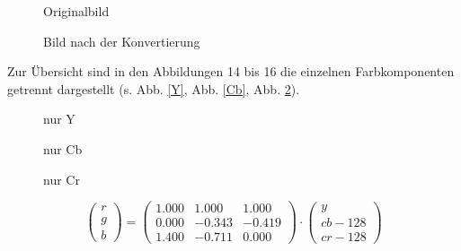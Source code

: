 \documentclass[a4paper,12pt,abstracton,titlepage]{scrartcl}
\begin{document}
\begin{figure}[htbp]
\begin{minipage}[t]{0.48\textwidth}
  \begin{center}
    \caption{Originalbild}
    \label{originalY}
  \end{center}
\end{minipage}
\begin{minipage}[t]{0.52\textwidth}
  \begin{center}
    \caption{Bild nach der Konvertierung}
    \label{rgb2ycbcr}
  \end{center}
\end{minipage}
\end{figure}
Zur Übersicht sind in den Abbildungen 14 bis 16 die einzelnen Farbkomponenten getrennt dargestellt (s. Abb. \ref{Y}, Abb. \ref{Cb}, Abb. \ref{Cr}).


\begin{figure}[htbp]
\begin{minipage}[t]{0.31\textwidth}
  \begin{center}
    \caption{nur Y}
    \label{Y}
  \end{center}
\end{minipage}
\begin{minipage}[t]{0.31\textwidth}
  \begin{center}
    \caption{nur Cb}
    \label{Cb}
  \end{center}
\end{minipage}
\begin{minipage}[t]{0.31\textwidth}
  \begin{center}
    \caption{nur Cr}
    \label{Cr}
  \end{center}
\end{minipage}
\end{figure}

 
\[
    \left(\begin{array}{c} r \\ g \\ b \end{array}\right) =
    \begin{pmatrix} 1.000 & 1.000 & 1.000 \\ 0.000 & -0.343 & -0.419 \\ 1.400 & -0.711 & 0.000
    
    \end{pmatrix}
    \cdot \left(\begin{array}{c} y \\ cb - 128 \\ cr - 128 \end{array}\right)
\]
\end{document}
